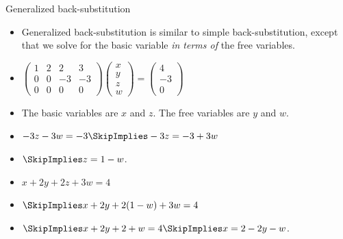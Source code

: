 \documentclass{beamer}
\begin{document}
\begin{frame}{Generalized back-substitution}

\begin{itemize}
\item Generalized back-substitution is similar to simple back-substitution, except that we solve for the basic variable \emph{in terms of} the free variables.
\item
$
\begin{pmatrix}
1 & 2 & 2 & 3 \\
0 & 0 & -3 & -3 \\
0 & 0 & 0 & 0
\end{pmatrix}
\begin{pmatrix}
x \\ y \\ z \\ w
\end{pmatrix}
=
\begin{pmatrix}
4 \\ -3 \\  0
\end{pmatrix}
$
\item The basic variables are $x$ and $z$. The free variables are $y$ and $w$.
\item $-3z -3w = -3 \SkipImplies -3z = -3 + 3w $
\item $ \SkipImplies z = 1 - w$.
\item $x + 2y +2z +3w = 4 $
\item $\SkipImplies x +2y + 2(1-w) + 3w = 4$
\item $\SkipImplies x + 2y +2 +w = 4 \SkipImplies x = 2 -2y - w$.
\end{itemize}
\end{frame}
\end{document}

